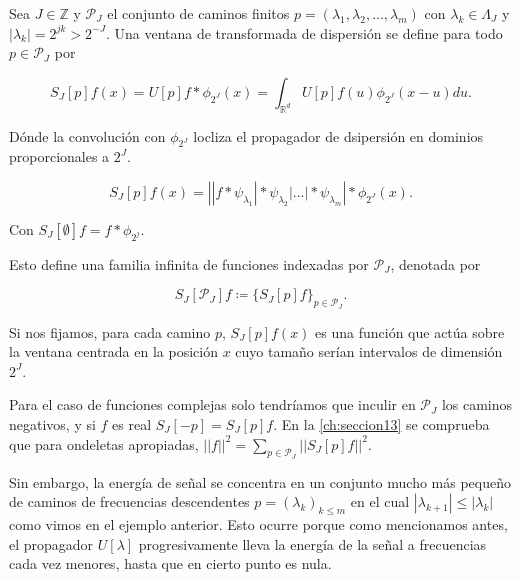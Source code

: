 \begin{definicion}
Sea $J \in \mathbb{Z}$ y $\mathcal{P}_J$ el conjunto de caminos finitos $p=(\lambda_1,\lambda_2,...,\lambda_m)$ con $\lambda_k \in \Lambda_J$ y $|\lambda_k|=2^{jk}>2^{-J}$. Una ventana de transformada de dispersión se define para todo $p \in \mathcal{P}_J$ por

\begin{equation}
  S_J[p]f(x)=U[p]f \ast \phi_{2^J}(x)=\int_{\mathbb{R}^d}U[p]f(u)\phi_{2^J}(x-u)du.
\end{equation}

\noindent Dónde la convolución con $\phi_{2^J}$ locliza el propagador de dsipersión en dominios proporcionales a $2^J$.

\begin{equation}
  S_J[p]f(x)=\left| |f \ast \psi_{\lambda_1} | \ast \psi_{\lambda_2} | ... | \ast \psi_{\lambda_m} \right| \ast \phi_{2^J}(x).
\end{equation}

Con $S_J[\emptyset] f= f \ast \phi_{2^j}$.
\end{definicion}


\noindent Esto define una familia infinita de funciones indexadas por $\mathcal{P}_J$, denotada por

$$S_J[\mathcal{P}_J]f \coloneqq \lbrace S_J[p]f \rbrace_{p\in\mathcal{P}_J}.$$

\medskip

\noindent Si nos fijamos, para cada camino $p$, $S_J[p]f(x)$ es una función que actúa sobre la ventana centrada en la posición $x$ cuyo tamaño serían intervalos de dimensión $2^J$.

\medskip

\noindent Para el caso de funciones complejas solo tendríamos que inculir en $\mathcal{P}_J$ los caminos negativos, y si $f$ es real $S_J[-p]=S_J[p]f$.
\noindent En la \autoref{ch:seccion13} se comprueba que para ondeletas apropiadas, $||f||^2=\sum_{p\in\mathcal{P}_J}\left|\left|S_J[p]f\right|\right|^2$. 

\medskip

\noindent Sin embargo, la energía de señal se concentra en un conjunto mucho más pequeño de caminos de frecuencias descendentes $p=(\lambda_k)_{k\leq m}$ en el cual $|\lambda_{k+1}| \leq |\lambda_k|$ como vimos en el ejemplo anterior. Esto ocurre porque como mencionamos antes, el propagador $U[\lambda]$ progresivamente lleva la energía de la señal a frecuencias cada vez menores, hasta que en cierto punto es nula.


